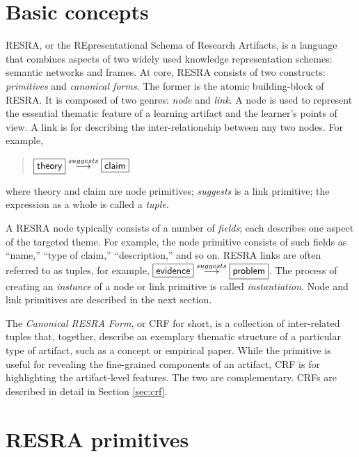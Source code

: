 \section{Basic concepts}
\label{sec:concepts}

RESRA, or the REpresentational Schema of Research Artifacts, is a language
that combines aspects of two widely used knowledge representation schemes:
semantic networks and frames. At core, RESRA consists of two constructs:
{\it primitives\/} and {\it canonical forms\/}. The former is the atomic
building-block of RESRA. It is composed of two genres: {\it node\/} and
{\it link\/}. A node is used to represent the essential thematic feature of
a learning artifact and the learner's points of view. A link is for
describing the inter-relationship between any two nodes. For example,

\begin{quotation}
 \( \fbox{{\sf theory}} \stackrel{suggests}{\longrightarrow} \fbox{{\sf
 claim}} \)
\end{quotation}

where {\sf theory\/} and {\sf claim\/} are node primitives; {\it
suggests\/} is a link primitive; the expression as a whole is called a {\sl
tuple\/}.

A RESRA node typically consists of a number of {\it fields\/}; each
describes one aspect of the targeted theme. For example, the node primitive
 consists of such fields as ``name,'' ``type of
claim,'' ``description,'' and so on. RESRA links are often referred to as
tuples, for example, \( \fbox{{\sf evidence}}
\stackrel{suggests}{\longrightarrow} \fbox{{\sf problem}} \).  The process
of creating an {\it instance\/} of a node or link primitive is called {\it
instantiation\/}. Node and link primitives are described in the next
section.

The {\it Canonical RESRA Form\/}, or CRF for short, is a collection of
inter-related tuples that, together, describe an exemplary thematic
structure of a particular type of artifact, such as a concept or empirical
paper. While the primitive is useful for revealing the fine-grained
components of an artifact, CRF is for highlighting the artifact-level
features. The two are complementary. CRFs are described in detail in
Section \ref{sec:crf}.


\section{RESRA primitives}
\label{sec:resra-primitives}

